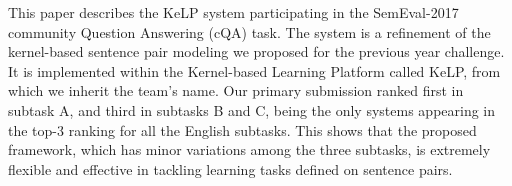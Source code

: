 This paper describes the KeLP system participating in the SemEval-2017 community Question Answering (cQA) task. The system is a refinement of the kernel-based sentence pair modeling we proposed for the previous year challenge. It is implemented within the Kernel-based Learning Platform called KeLP, from which we inherit the team's name. Our primary submission ranked first in subtask A, and third in subtasks B and C, being the only systems appearing in the top-3 ranking for all the English subtasks. This shows that the proposed framework, which has minor variations among the three subtasks, is extremely flexible and effective in tackling learning tasks defined on sentence pairs.

